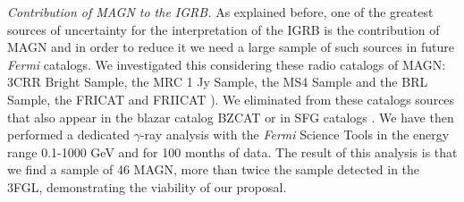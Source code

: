 \documentclass[12 pt]{article}
\begin{document}
{\it Contribution of MAGN to the IGRB.}
As explained before, one of the greatest sources of uncertainty for the interpretation of the IGRB is the contribution of MAGN and in order to reduce it we need a large sample of such sources in future {\it Fermi} catalogs.
We investigated this considering these radio catalogs of MAGN: 3CRR Bright Sample, the MRC 1 Jy Sample, the MS4 Sample and the BRL Sample, the FRICAT \cite{Capetti:2016srb} and FRIICAT \cite{Capetti:2017fjb}).
We eliminated from these catalogs sources that also appear in the blazar catalog BZCAT \cite{Massaro:2015nia} or in SFG catalogs \cite{Sanders:2003ms,2004ApJ...606..271G}. 
We have then performed a dedicated $\gamma$-ray analysis with the {\it Fermi} Science Tools in the energy range 0.1-1000 GeV and for 100 months of data. 
The result of this analysis is that we find a sample of 46 MAGN, more than twice the sample detected in the 3FGL, demonstrating the viability of our proposal.


\end{document}
